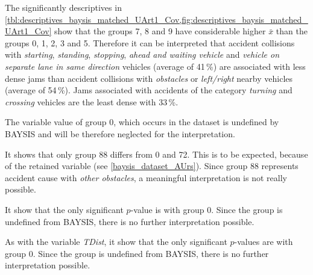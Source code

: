 The significantly descriptives in \cref{tbl:descriptives_baysis_matched_UArt1_Cov,fig:descriptives_baysis_matched_UArt1_Cov} show that the groups 7, 8 and 9 have considerable higher $\bar{x}$ than the groups 0, 1, 2, 3 and 5. Therefore it can be interpreted that accident collisions with \textit{starting}, \textit{standing}, \textit{stopping}, \textit{ahead and waiting vehicle} and \textit{vehicle on separate lane in same direction} vehicles (average of 41\,\%) are associated with less dense jams than accident collisions with \textit{obstacles} or \textit{left/right} nearby vehicles (average of 54\,\%). Jams associated with accidents of the category \textit{turning} and \textit{crossing} vehicles are the least dense with 33\,\%.

 The variable value of group 0, which occurs in the dataset is undefined by BAYSIS and will be therefore neglected for the interpretation.  

It shows that only group 88 differs from 0 and 72. This is to be expected, because of the retained variable (see \cref{baysis_dataset_AUrs}). Since group 88 represents accident cause with \textit{other obstacles}, a meaningful interpretation is not really possible. 

It show that the only significant $p$-value is with group 0. Since the group is undefined from BAYSIS, there is no further interpretation possible.

As with the variable \textit{TDist}, it show that the only significant $p$-values are with group 0. Since the group is undefined from BAYSIS, there is no further interpretation possible.

  

